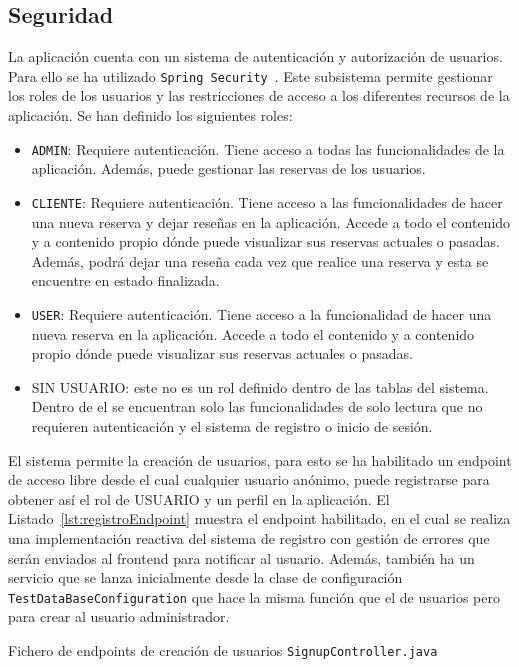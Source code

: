\subsection{Seguridad}
La aplicación cuenta con un sistema de autenticación y autorización de usuarios. Para ello se ha utilizado \texttt{Spring Security}~\cite{springsecurity}. Este subsistema permite gestionar los roles de los usuarios y las restricciones de acceso a los diferentes recursos de la aplicación. Se han definido los siguientes roles:
\begin{itemize}
    \item \texttt{ADMIN}: Requiere autenticación. Tiene acceso a todas las funcionalidades de la aplicación. Además, puede gestionar las reservas de los usuarios.
    \item \texttt{CLIENTE}: Requiere autenticación. Tiene acceso a las funcionalidades de hacer una nueva reserva y dejar reseñas en la aplicación. Accede a todo el contenido y a contenido propio dónde puede visualizar sus reservas actuales o pasadas. Además, podrá dejar una reseña cada vez que realice una reserva y esta se encuentre en estado finalizada.
    \item \texttt{USER}: Requiere autenticación. Tiene acceso a la funcionalidad de hacer una nueva reserva  en la aplicación. Accede a todo el contenido y a contenido propio dónde puede visualizar sus reservas actuales o pasadas.
    \item SIN USUARIO: este no es un rol definido dentro de las tablas del sistema. Dentro de el se encuentran solo las funcionalidades de solo lectura que no requieren autenticación y el sistema de registro o inicio de sesión.
\end{itemize}
El sistema permite la creación de usuarios, para esto se ha habilitado un endpoint de acceso libre desde el cual cualquier usuario anónimo, puede registrarse para obtener así el rol de USUARIO y un perfil en la aplicación. El Listado~\ref{lst:registroEndpoint} muestra el endpoint habilitado, en el cual se realiza una implementación reactiva del sistema de registro con gestión de errores que serán enviados al frontend para notificar al usuario. Además, también ha un servicio que se lanza inicialmente desde la clase de configuración \texttt{TestDataBaseConfiguration} que hace la misma función que el de usuarios pero para crear al usuario administrador. 
\begin{longlisting}
    \caption{Fichero de endpoints de creación de usuarios {\tt SignupController.java}}
    \inputminted[highlightlines={30}, firstline=20, lastline=45]{java}{../backend/elrincondeeva/elrincondeeva/src/main/java/es/uv/hemal/elrincondeeva/endpoints/SignupController.java}
    \label{lst:registroEndpoint}
\end{longlisting}
